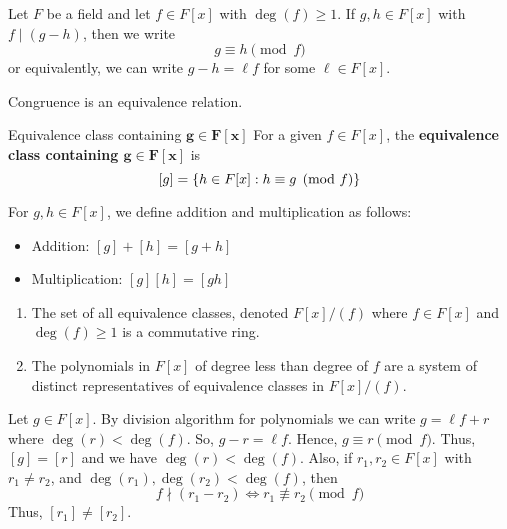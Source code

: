 \begin{Definition}{}{}
    Let $ F $ be a field and let $ f\in F[x] $ with $ \deg(f)\geqslant 1 $.
    If $ g,h\in F[x] $ with $ f\mid (g-h) $, then we write
    \[ g\equiv h \pmod{f} \]
    or equivalently, we can write $ g-h=\ell f $ for some $ \ell\in F[x] $.
\end{Definition}

\begin{Theorem}{}{}
    Congruence is an equivalence relation.
\end{Theorem}

\begin{Definition}{Equivalence class containing $\symbf{g\in F[x]}$}{}
    For a given $ f\in F[x] $, the \textbf{equivalence class containing $\symbf{g\in F[x]}$}
    is
    \[ [g]=\{h\in F[x]: h\equiv g\pmod{f}\} \]
\end{Definition}

\begin{Definition}{}{}
    For $ g,h\in F[x] $, we define addition and multiplication as follows:
    \begin{itemize}
        \item Addition: $ [g]+[h]=[g+h] $
        \item Multiplication: $ [g][h]=[gh] $
    \end{itemize}
\end{Definition}

\begin{Theorem}{}{}
    \begin{enumerate}[label=(\arabic*)]
        \item The set of all equivalence classes, denoted $ F[x]/(f) $
              where $ f\in F[x] $ and $ \deg(f)\geqslant 1 $ is a
              commutative ring.
        \item The polynomials in $ F[x] $ of degree less than degree of $ f $
              are a system of distinct representatives of equivalence classes in
              $ F[x]/(f)$.
    \end{enumerate}
\end{Theorem}

\begin{Proof}{}{}
    Let $ g\in F[x] $. By division algorithm for polynomials we can write
    $ g=\ell f+r $ where $ \deg(r)<\deg(f) $. So, $ g-r=\ell f $. Hence,
    $ g\equiv r\pmod{f} $. Thus, $ [g]=[r] $ and we have $ \deg(r)<\deg(f) $.
    Also, if $ r_1,r_2\in F[x] $ with $ r_1\neq r_2 $, and
    $ \deg(r_1),\deg(r_2)<\deg(f) $, then
    \[ f\nmid (r_1-r_2)\iff r_1\not\equiv r_2\pmod{f} \]
    Thus, $ [r_1]\neq [r_2] $.
\end{Proof}
